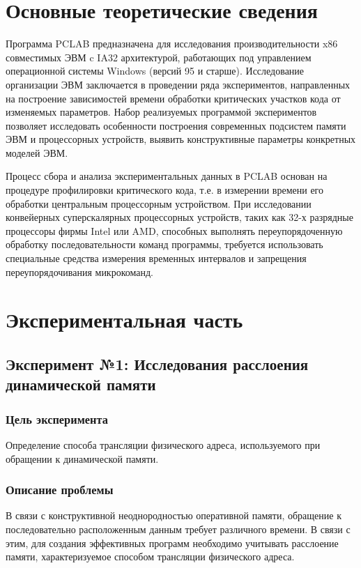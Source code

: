 \chapter{Основные теоретические сведения}
Программа PCLAB предназначена для исследования производительности x86 совместимых ЭВМ c IA32 архитектурой, работающих под управлением операционной системы Windows (версий 95 и старше). Исследование организации ЭВМ заключается в проведении ряда экспериментов, направленных на построение зависимостей времени обработки критических участков кода от изменяемых параметров. Набор реализуемых программой экспериментов позволяет исследовать особенности построения современных подсистем памяти ЭВМ и процессорных устройств, выявить конструктивные параметры конкретных моделей ЭВМ. 

Процесс сбора и анализа экспериментальных данных в PCLAB основан на процедуре профилировки критического кода, т.е. в измерении времени его обработки центральным процессорным устройством. При исследовании конвейерных суперскалярных процессорных устройств, таких как 32-х разрядные процессоры фирмы Intel или AMD, способных выполнять переупорядоченную обработку последовательности команд программы, требуется использовать специальные средства измерения временных интервалов и запрещения переупорядочивания микрокоманд. 

\chapter{Экспериментальная часть}


\section*{Эксперимент №1: Исследования расслоения динамической памяти}

\subsection*{Цель эксперимента}
Определение способа трансляции физического адреса, используемого при обращении к динамической памяти. 

\subsection*{Описание проблемы}
В связи с конструктивной неоднородностью оперативной памяти, обращение к последовательно расположенным данным требует различного времени. В связи с этим, для создания эффективных программ необходимо учитывать расслоение памяти, характеризуемое способом трансляции физического адреса.

